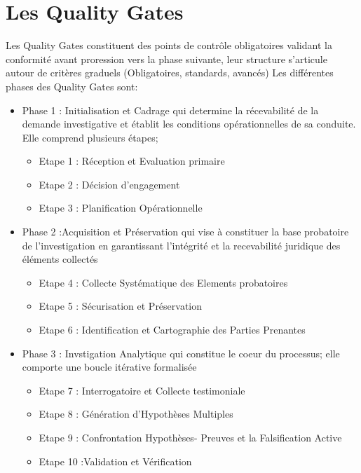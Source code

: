\documentclass[french]{article}
\begin{document}
\section{Les Quality Gates}
Les Quality Gates constituent des points de contrôle obligatoires validant la conformité avant proression vers la phase suivante, leur structure s'articule autour de critères graduels (Obligatoires, standards, avancés)
Les différentes phases des Quality Gates sont:
\begin{itemize}
    \item Phase 1 : Initialisation et Cadrage qui determine la récevabilité de la demande investigative et établit les conditions opérationnelles de sa conduite. Elle comprend plusieurs étapes;
    \begin{itemize}
        \item Etape 1 : Réception et Evaluation primaire
        \item Etape 2 : Décision d'engagement
        \item Etape 3 : Planification Opérationnelle  
    \end{itemize} 
    \item Phase 2 :Acquisition et Préservation qui vise à constituer la base probatoire de l'investigation en garantissant l'intégrité et la recevabilité juridique des éléments collectés
    \begin{itemize}
        \item Etape 4 : Collecte Systématique des Elements probatoires
        \item Etape 5 : Sécurisation et Préservation
        \item Etape 6 : Identification et Cartographie des Parties Prenantes
    \end{itemize}
    \item Phase 3 : Invstigation Analytique qui constitue le coeur du processus; elle comporte une boucle itérative formalisée
\begin{itemize}
    \item Etape 7 : Interrogatoire et Collecte testimoniale
    \item Etape 8 : Génération d'Hypothèses Multiples
    \item Etape 9 : Confrontation Hypothèses- Preuves et la Falsification Active
    \item Etape 10 :Validation et Vérification
\end{itemize}


\end{itemize}
\end{document}
